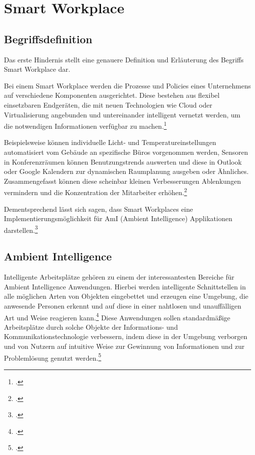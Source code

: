 \newpage
\section{Smart Workplace}
\subsection{Begriffsdefinition}
Das erste Hindernis stellt eine genauere Definition und Erläuterung des Begriffs Smart Workplace dar. 

Bei einem Smart Workplace werden die Prozesse und Policies eines Unternehmens auf verschiedene Komponenten ausgerichtet. Diese bestehen aus flexibel einsetzbaren Endgeräten, die mit neuen Technologien wie Cloud oder Virtualisierung angebunden und untereinander intelligent vernetzt werden, um die notwendigen Informationen verfügbar zu machen.\footcite[Vgl.][]{nextchange}

Beispielsweise können individuelle Licht- und Temperatureinstellungen automatisiert vom Gebäude an spezifische Büros vorgenommen werden, Sensoren in Konferenzräumen können Benutzungstrends auswerten und diese in Outlook oder Google Kalendern zur dynamischen Raumplanung ausgeben oder Ähnliches. Zusammengefasst können diese scheinbar kleinen Verbesserungen Ablenkungen vermindern und die Konzentration der Mitarbeiter erhöhen.\footcite[Vgl.][]{iotagenda}

Dementsprechend lässt sich sagen, dass Smart Workplaces eine Implementierungsmöglichkeit für AmI (Ambient Intelligence) Applikationen darstellen.\footcite[Vgl.][Seite 401]{leseprobe}

\subsection{Ambient Intelligence}
Intelligente Arbeitsplätze gehören zu einem der interessantesten Bereiche für Ambient Intelligence Anwendungen. 
Hierbei werden intelligente Schnittstellen in alle möglichen Arten von Objekten eingebettet und erzeugen eine Umgebung, die anwesende Personen erkennt und auf diese in einer nahtlosen und unauffälligen Art und Weise reagieren kann.\footcite[Vgl.][Seite 1]{istag} Diese Anwendungen sollen standardmäßige Arbeitsplätze durch solche Objekte der Informations- und Kommunikationstechnologie verbessern, indem diese in der Umgebung verborgen und von Nutzern auf intuitive Weise zur Gewinnung von Informationen und zur Problemlösung genutzt werden.\footcite[Vgl.][Seite 401]{leseprobe}

